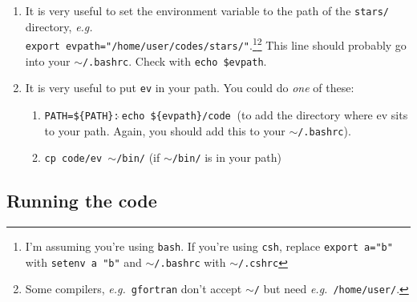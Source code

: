 \begin{enumerate}
\item \label{item:evpath} It is very useful to set the environment variable to the path of the \texttt{stars/} directory, \emph{e.g.}\ \\
  \texttt{export evpath="/home/user/codes/stars/"}.\footnote{I'm assuming you're using \texttt{bash}.  If you're using \texttt{csh}, replace \texttt{export a="b"} with \texttt{setenv a "b"}
  and \texttt{$\sim$/.bashrc} with \texttt{$\sim$/.cshrc}}\footnote{Some compilers, \emph{e.g.}\ \texttt{gfortran} don't accept \texttt{$\sim$/} but need \emph{e.g.}\ \texttt{/home/user/}.}
  This line should probably go into your \texttt{$\sim$/.bashrc}.  Check with \texttt{echo \$evpath}.

\item \label{item:path} It is very useful to put \texttt{ev} in your path.  You could do \emph{one} of these:
  \begin{enumerate}
  \item \texttt{PATH=\$\{PATH\}:$\grave{~}$echo \$\{evpath\}/code$\grave{~}$}  (to add the directory where ev sits to your path. Again, you should add this to your \texttt{$\sim$/.bashrc}).
  \item \texttt{cp code/ev $\sim$/bin/} (if \texttt{$\sim$/bin/} is in your path)
  \end{enumerate}
\end{enumerate}



\subsection{Running the code}
\label{sec:run}



